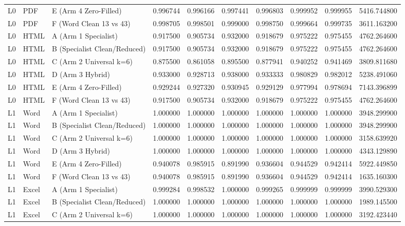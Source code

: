 \begin{tabular}{lllrrrrrrr}
L0 & PDF & E (Arm 4 Zero-Filled) & 0.996744 & 0.996166 & 0.997441 & 0.996803 & 0.999952 & 0.999955 & 5416.744800 \\
L0 & PDF & F (Word Clean 13 vs 43) & 0.998705 & 0.998501 & 0.999000 & 0.998750 & 0.999664 & 0.999735 & 3611.163200 \\
L0 & HTML & A (Arm 1 Specialist) & 0.917500 & 0.905734 & 0.932000 & 0.918679 & 0.975222 & 0.975455 & 4762.264600 \\
L0 & HTML & B (Specialist Clean/Reduced) & 0.917500 & 0.905734 & 0.932000 & 0.918679 & 0.975222 & 0.975455 & 4762.264600 \\
L0 & HTML & C (Arm 2 Universal k=6) & 0.875500 & 0.861058 & 0.895500 & 0.877941 & 0.940252 & 0.941469 & 3809.811680 \\
L0 & HTML & D (Arm 3 Hybrid) & 0.933000 & 0.928713 & 0.938000 & 0.933333 & 0.980829 & 0.982012 & 5238.491060 \\
L0 & HTML & E (Arm 4 Zero-Filled) & 0.929244 & 0.927320 & 0.930945 & 0.929129 & 0.977994 & 0.978694 & 7143.396899 \\
L0 & HTML & F (Word Clean 13 vs 43) & 0.917500 & 0.905734 & 0.932000 & 0.918679 & 0.975222 & 0.975455 & 4762.264600 \\
L1 & Word & A (Arm 1 Specialist) & 1.000000 & 1.000000 & 1.000000 & 1.000000 & 1.000000 & 1.000000 & 3948.299900 \\
L1 & Word & B (Specialist Clean/Reduced) & 1.000000 & 1.000000 & 1.000000 & 1.000000 & 1.000000 & 1.000000 & 3948.299900 \\
L1 & Word & C (Arm 2 Universal k=6) & 1.000000 & 1.000000 & 1.000000 & 1.000000 & 1.000000 & 1.000000 & 3158.639920 \\
L1 & Word & D (Arm 3 Hybrid) & 1.000000 & 1.000000 & 1.000000 & 1.000000 & 1.000000 & 1.000000 & 4343.129890 \\
L1 & Word & E (Arm 4 Zero-Filled) & 0.940078 & 0.985915 & 0.891990 & 0.936604 & 0.944529 & 0.942414 & 5922.449850 \\
L1 & Word & F (Word Clean 13 vs 43) & 0.940078 & 0.985915 & 0.891990 & 0.936604 & 0.944529 & 0.942414 & 1635.160300 \\
L1 & Excel & A (Arm 1 Specialist) & 0.999284 & 0.998532 & 1.000000 & 0.999265 & 0.999999 & 0.999999 & 3990.529300 \\
L1 & Excel & B (Specialist Clean/Reduced) & 1.000000 & 1.000000 & 1.000000 & 1.000000 & 1.000000 & 1.000000 & 1989.145500 \\
L1 & Excel & C (Arm 2 Universal k=6) & 1.000000 & 1.000000 & 1.000000 & 1.000000 & 1.000000 & 1.000000 & 3192.423440 \\

\end{tabular}
